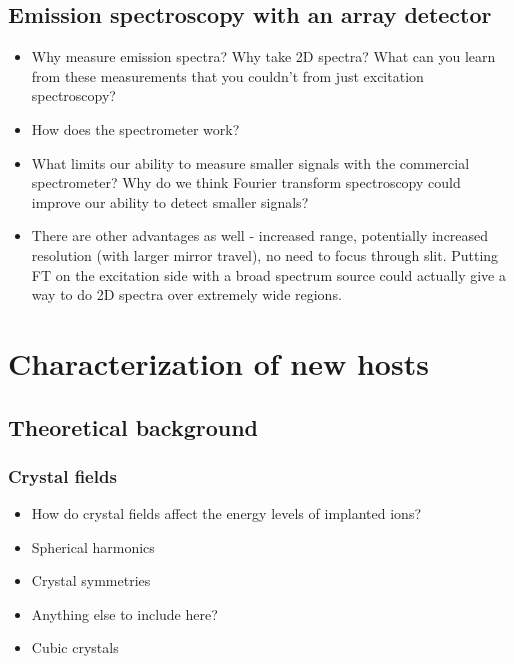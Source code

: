 \documentclass[12pt]{puthesis}
\begin{document}
\section{Emission spectroscopy with an array detector}
\label{sec:emiss-spectr-with}

\begin{itemize}
\item Why measure emission spectra? Why take 2D spectra? What can you learn from these measurements that you couldn't from just excitation spectroscopy?

\item How does the spectrometer work? 

\item What limits our ability to measure smaller signals with the commercial spectrometer? Why do we think Fourier transform spectroscopy could improve our ability to detect smaller signals?

\item There are other advantages as well - increased range, potentially increased resolution (with larger mirror travel), no need to focus through slit. Putting FT on the excitation side with a broad spectrum source could actually give a way to do 2D spectra over extremely wide regions.
\end{itemize}




\chapter{Characterization of new hosts}

\section{Theoretical background}

\subsection{Crystal fields}
\begin{itemize}
  
\item How do crystal fields affect the energy levels of implanted ions?

\item Spherical harmonics

\item Crystal symmetries 

\item Anything else to include here?

\item Cubic crystals
\end{itemize}
\end{document}
